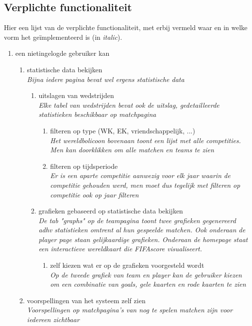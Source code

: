 \documentclass[11pt, a4paper]{article}
\begin{document}
 \subsection{Verplichte functionaliteit}
 Hier een lijst van de verplichte functionaliteit, met erbij vermeld waar en in welke vorm het ge\"implementeerd is (in \textit{italic}).
 \begin{enumerate}
 \item een nietingelogde gebruiker kan
 \begin{enumerate}
 \item statistische data bekijken\\
 \textit{Bijna iedere pagina bevat wel ergens statistische data}
 \begin{enumerate}
 \item uitslagen van wedstrijden \\
 \textit{Elke tabel van wedstrijden bevat ook de uitslag, gedetailleerde statistieken beschikbaar op matchpagina}
 \begin{enumerate}
 \item filteren op type (WK, EK, vriendschappelijk, ...) \\
 \textit{Het wereldbolicoon bovenaan toont een lijst met alle competities. Men kan doorklikken om alle matchen en teams te zien}
 \item filteren op tijdsperiode \\
 \textit{Er is een aparte competitie aanwezig voor elk jaar waarin de competitie gehouden werd, men moet dus tegelijk met filteren op competitie ook op jaar filteren}
 \end{enumerate}
 \item grafieken gebaseerd op statistische data bekijken \\
 \textit{De tab "graphs" op de teampagina toont twee grafieken gegenereerd adhv statistieken omtrent al hun gespeelde matchen. Ook onderaan de player page staan gelijkaardige grafieken. Onderaan de homepage staat een interactieve wereldkaart die FIFAscore visualiseert.}
 \begin{enumerate}
 \item zelf kiezen wat er op de grafieken voorgesteld wordt \\
 \textit{Op de tweede grafiek van team en player kan de gebruiker kiezen om een combinatie van goals, gele kaarten en rode kaarten te zien}
 \end{enumerate}
 \end{enumerate}
 \item voorspellingen van het systeem zelf zien \\
 \textit{Voorspellingen op matchpagina's van nog te spelen matchen zijn voor iedereen zichtbaar}
 \end{enumerate}


\end{enumerate}
\end{document}

